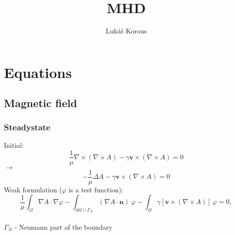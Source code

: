 \documentclass[smallextended]{svjour3}       %
\begin{document}
\title{MHD}


\author{Luk\' a\v s Korous}


\maketitle

\section{Equations}

	\subsection{Magnetic field}
	
		\subsubsection{Steadystate}
		Initial:
		\begin{equation}
			\frac{1}{\mu}\nabla \times \left(\nabla \times A \right) - \gamma \mathbf{v} \times \left( \nabla \times A \right) = 0
		\end{equation}
		$\rightarrow$
		\begin{equation}
			-\frac{1}{\mu}\Delta A - \gamma \mathbf{v} \times \left( \nabla \times A \right) = 0
		\end{equation}
		Weak formulation  ($\varphi$ is a test function):
		\begin{equation}
			\frac{1}{\mu}\int_{\Omega}\nabla A \cdot \nabla \varphi - \int_{\partial \Omega \cap \Gamma_{N}} \left(\nabla A \cdot \mathbf{n}\right)\ \varphi 
			 - \int_{\Omega} \gamma \left[\mathbf{v} \times \left( \nabla \times A \right)\right]\,\varphi = 0,
		\end{equation}\ \\
		$\Gamma_{N}$ - Neumann part of the boundary\ \\
		
\end{document}
